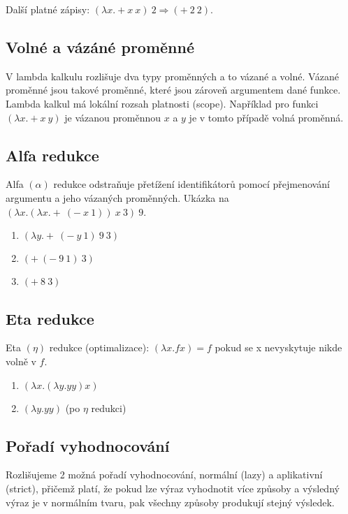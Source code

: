 \documentclass{szzclass}
\begin{document}
Další platné zápisy: $(\lambda x. + x\ x)\ 2 \Rightarrow (+\ 2\ 2)$.

\subsection{Volné a vázáné proměnné}

V lambda kalkulu rozlišuje dva typy proměnných a to vázané a volné. Vázané proměnné jsou takové proměnné, které jsou zároveň argumentem dané funkce. Lambda kalkul má lokální rozsah platnosti (scope). Například pro funkci $(\lambda x . + x\ y)$ je vázanou proměnnou $x$ a $y$ je v tomto případě volná proměnná.

\newpage

\subsection{Alfa redukce}

Alfa $(\alpha)$ redukce odstraňuje přetížení identifikátorů pomocí přejmenování argumentu a jeho vázaných proměnných.
Ukázka na $(\lambda x . (\lambda x . +\ (-\ x\ 1))\ x\ 3)\ 9$.
\begin{enumerate}
    \item $(\lambda y . +\ (-\ y\ 1)\ 9\ 3)$
    \item $(+\ (-\ 9\ 1)\ 3)$
    \item $(+\ 8\ 3)$
\end{enumerate}


\subsection{Eta redukce}
Eta $(\eta)$ redukce (optimalizace): $(\lambda x. fx) = f$ pokud se x nevyskytuje nikde volně v $f$.

\begin{enumerate}
    \item $(\lambda x.(\lambda y.yy)x)$
    \item $(\lambda y. yy)$ (po $\eta$ redukci)
\end{enumerate}


\subsection{Pořadí vyhodnocování}

Rozlišujeme 2 možná pořadí vyhodnocování, normální (lazy) a aplikativní (strict), přičemž platí, že pokud lze výraz
vyhodnotit více způsoby a výsledný výraz je v normálním tvaru, pak všechny způsoby produkují stejný výsledek.
\end{document}

